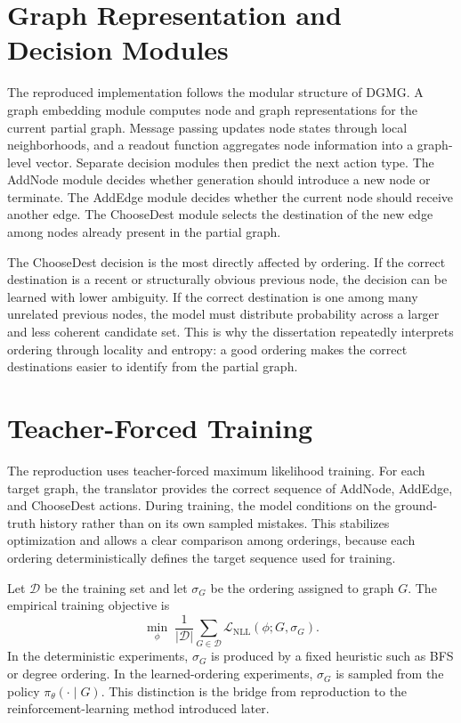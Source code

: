 \section{Graph Representation and Decision Modules}
\label{sec:dgmg-modules}

The reproduced implementation follows the modular structure of DGMG. A graph embedding module computes node and graph representations for the current partial graph. Message passing updates node states through local neighborhoods, and a readout function aggregates node information into a graph-level vector. Separate decision modules then predict the next action type. The AddNode module decides whether generation should introduce a new node or terminate. The AddEdge module decides whether the current node should receive another edge. The ChooseDest module selects the destination of the new edge among nodes already present in the partial graph.

The ChooseDest decision is the most directly affected by ordering. If the correct destination is a recent or structurally obvious previous node, the decision can be learned with lower ambiguity. If the correct destination is one among many unrelated previous nodes, the model must distribute probability across a larger and less coherent candidate set. This is why the dissertation repeatedly interprets ordering through locality and entropy: a good ordering makes the correct destinations easier to identify from the partial graph.

\section{Teacher-Forced Training}
\label{sec:dgmg-training}

The reproduction uses teacher-forced maximum likelihood training. For each target graph, the translator provides the correct sequence of AddNode, AddEdge, and ChooseDest actions. During training, the model conditions on the ground-truth history rather than on its own sampled mistakes. This stabilizes optimization and allows a clear comparison among orderings, because each ordering deterministically defines the target sequence used for training.

Let $\mathcal{D}$ be the training set and let $\sigma_G$ be the ordering assigned to graph $G$. The empirical training objective is
\begin{equation}
    \min_\phi \; \frac{1}{|\mathcal{D}|}\sum_{G\in\mathcal{D}}\mathcal{L}_{\mathrm{NLL}}(\phi;G,\sigma_G).
\end{equation}
In the deterministic experiments, $\sigma_G$ is produced by a fixed heuristic such as BFS or degree ordering. In the learned-ordering experiments, $\sigma_G$ is sampled from the policy $\pi_\theta(\cdot\mid G)$. This distinction is the bridge from reproduction to the reinforcement-learning method introduced later.


